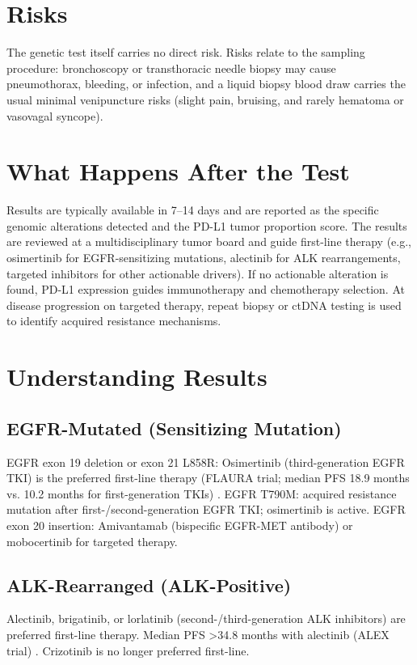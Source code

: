 \section*{Risks}
The genetic test itself carries no direct risk. Risks relate to the sampling procedure: bronchoscopy or transthoracic needle biopsy may cause pneumothorax, bleeding, or infection, and a liquid biopsy blood draw carries the usual minimal venipuncture risks (slight pain, bruising, and rarely hematoma or vasovagal syncope).

\section*{What Happens After the Test}
Results are typically available in 7--14 days and are reported as the specific genomic alterations detected and the PD-L1 tumor proportion score. The results are reviewed at a multidisciplinary tumor board and guide first-line therapy (e.g., osimertinib for EGFR-sensitizing mutations, alectinib for ALK rearrangements, targeted inhibitors for other actionable drivers). If no actionable alteration is found, PD-L1 expression guides immunotherapy and chemotherapy selection. At disease progression on targeted therapy, repeat biopsy or ctDNA testing is used to identify acquired resistance mechanisms.

\section*{Understanding Results}

\subsection*{EGFR-Mutated (Sensitizing Mutation)}
EGFR exon 19 deletion or exon 21 L858R: Osimertinib (third-generation EGFR TKI) is the preferred first-line therapy (FLAURA trial; median PFS 18.9 months vs. 10.2 months for first-generation TKIs) \cite{soria2018osimertinib}. EGFR T790M: acquired resistance mutation after first-/second-generation EGFR TKI; osimertinib is active. EGFR exon 20 insertion: Amivantamab (bispecific EGFR-MET antibody) or mobocertinib for targeted therapy.

\subsection*{ALK-Rearranged (ALK-Positive)}
Alectinib, brigatinib, or lorlatinib (second-/third-generation ALK inhibitors) are preferred first-line therapy. Median PFS >34.8 months with alectinib (ALEX trial) \cite{peters2017alectinib}. Crizotinib is no longer preferred first-line.

